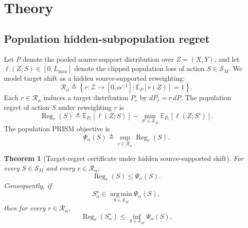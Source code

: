 \documentclass{article}
\newtheorem{theorem}{Theorem}
\newcommand{\EE}{\mathbb{E}}
\newcommand{\cR}{\mathcal{R}}
\newcommand{\cS}{\mathcal{S}}
\newcommand{\argmin}{\operatorname*{arg\,min}}
\newcommand{\prism}{\textup{\textsc{PRISM}}}
\newcommand{\braces}[1]{\left\{ #1 \right\}}
\newcommand{\loss}{\ell}
\newcommand{\1}{\mathbbm{1}}
\begin{document}
\section{Theory}
\label{sec:theory}

\subsection{Population hidden-subpopulation regret}

Let \(P\) denote the pooled source-support distribution over \(Z=(X,Y)\), and let \(\loss(Z;S)\in[0,L_{\max}]\) denote the clipped population loss of action \(S\in\cS_M\). We model target shift as a hidden source-supported reweighting:
\begin{equation}
    \cR_\alpha
    \triangleq
    \braces{
        r : \mathcal{Z}\to[0,\alpha^{-1}] :
        \EE_P[r(Z)] = 1
    }.
    \label{eq:population_reweightings}
\end{equation}
Each \(r\in \cR_\alpha\) induces a target distribution \(P_r\) by \(dP_r = r\,dP\). The population regret of action \(S\) under reweighting \(r\) is
\begin{equation}
    \operatorname{Reg}_r(S)
    \triangleq
    \EE_{P_r}[\loss(Z;S)]
    -
    \min_{S'\in\cS_M} \EE_{P_r}[\loss(Z;S')].
    \label{eq:population_regret}
\end{equation}
The population \prism{} objective is
\begin{equation}
    \Psi_\alpha(S)
    \triangleq
    \sup_{r\in\cR_\alpha} \operatorname{Reg}_r(S).
    \label{eq:population_prism}
\end{equation}

\begin{theorem}[Target-regret certificate under hidden source-supported shift]
\label{thm:certificate}
For every \(S\in\cS_M\) and every \(r\in\cR_\alpha\),
\begin{equation}
    \operatorname{Reg}_r(S)
    \le
    \Psi_\alpha(S).
    \label{eq:certificate_basic}
\end{equation}
Consequently, if
\begin{equation}
    S_\alpha^\star \in \argmin_{S\in\cS_M} \Psi_\alpha(S),
    \label{eq:population_minimizer}
\end{equation}
then for every \(r\in\cR_\alpha\),
\begin{equation}
    \operatorname{Reg}_r(S_\alpha^\star)
    \le
    \inf_{S\in\cS_M}\Psi_\alpha(S).
    \label{eq:certificate_minimized}
\end{equation}
\end{theorem}
\end{document}
